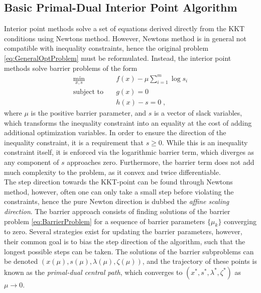 \subsection{Basic Primal-Dual Interior Point Algorithm}
Interior point methods solve a set of equations derived directly from the KKT conditions using Newtons method. However, Newtons method is in general not compatible with inequality constraints, hence the original problem \eqref{eq:GeneralOptProblem} must be reformulated. Instead, the interior point methods solve barrier problems of the form 
\begin{subequations}	
 \begin{align}
	\min_{x,s} 			\quad & f(x) - \mu \sum_{i = 1}^{m} \log s_i \\
	\text{subject to} 	\quad & g(x) = 0  		\\ 
						   	  & h(x) - s  = 0 	\; ,
\end{align}
\label{eq:BarrierProblem}
\end{subequations}
where $\mu$ is the positive barrier parameter, and $s$ is a vector of slack variables, which transforms the inequality constraint into an equality at the cost of adding additional optimization variables. In order to ensure the direction of the inequality constraint, it is a requirement that $s \geq 0$. While this is an inequality constraint itself, it is enforced via the logarithmic barrier term, which diverges as any component of $s$ approaches zero. Furthermore, the barrier term does not add much complexity to the problem, as it convex and twice differentiable.\\
The step direction towards the KKT-point can be found through Newtons method, however, often one can only take a small step before violating the constraints, hence the pure Newton direction is dubbed the \textit{affine scaling direction}. The barrier approach consists of finding solutions of the barrier problem \eqref{eq:BarrierProblem} for a sequence of barrier parameters $\{ \mu_k \}$ converging to zero. Several strategies exist for updating the barrier parameters, however, their common goal is to bias the step direction of the algorithm, such that the longest possible steps can be taken. The solutions of the barrier subproblems can be denoted $(x(\mu),s(\mu), \lambda(\mu),\zeta(\mu))$, and the trajectory of these points is known as the \textit{primal-dual central path}, which converges to $(x^*,s^*, \lambda^*,\zeta^*)$ as $\mu \to 0$.\\

